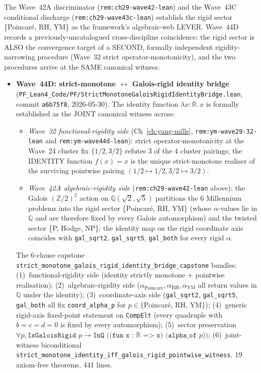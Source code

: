 \begin{remark}\label{rem:ch29-wave44d-lean}
The Wave~42A discriminator (\texttt{rem:ch29-wave42-lean}) and the Wave~43C conditional discharge (\texttt{rem:ch29-wave43c-lean}) establish the rigid sector \{Poincar\'e, RH, YM\} as the framework's algebraic-web LEVER. Wave~44D records a previously-uncatalogued cross-discipline coincidence: the rigid sector is ALSO the convergence target of a SECOND, formally independent rigidity-narrowing procedure (Wave~32 strict operator-monotonicity), and the two procedures arrive at the SAME canonical witness:
\begin{itemize}
  \item \textbf{Wave~44D: strict-monotone $\leftrightarrow$ Galois-rigid identity bridge} (\texttt{PF\_Lean4\_Code/PF/StrictMonotoneGaloisRigidIdentityBridge.lean}, commit \texttt{a6b75f8}, 2026-05-30). The identity function $\lambda x : \mathbb{R}.\, x$ is formally established as the JOINT canonical witness across:
  \begin{itemize}
    \item \emph{Wave~32 functional-rigidity side} (Ch~\ref{ch:yang-mills}, \texttt{rem:ym-wave29-32-lean} and \texttt{rem:ym-wave44d-lean}): strict operator-monotonicity at the Wave~24 cluster fix $\{1/2, 3/2\}$ refutes 3 of the 4 cluster pairings; the IDENTITY function $f(x) = x$ is the unique strict-monotone realiser of the surviving pointwise pairing $(1/2 \mapsto 1/2, 3/2 \mapsto 3/2)$.
    \item \emph{Wave~42A algebraic-rigidity side} (\texttt{rem:ch29-wave42-lean} above): the Galois $(\mathbb{Z}/2)^2$ action on $\mathbb{Q}(\sqrt{2}, \sqrt{5})$ partitions the 6 Millennium problems into the rigid sector \{Poincar\'e, RH, YM\} (whose $\alpha$-values lie in $\mathbb{Q}$ and are therefore fixed by every Galois automorphism) and the twisted sector \{P, Hodge, NP\}; the identity map on the rigid coordinate axis coincides with \texttt{gal\_sqrt2}, \texttt{gal\_sqrt5}, \texttt{gal\_both} for every rigid $\alpha$.
  \end{itemize}
  The 6-clause capstone \texttt{strict\_monotone\_galois\_rigid\_identity\_bridge\_capstone} bundles: (1)~functional-rigidity side (identity strictly monotone $+$ pointwise realisation); (2)~algebraic-rigidity side ($\alpha_{\mathrm{Poincar\acute{e}}}, \alpha_{\mathrm{RH}}, \alpha_{\mathrm{YM}}$ all return values in $\mathbb{Q}$ under the identity); (3)~coordinate-axis side (\texttt{gal\_sqrt2}, \texttt{gal\_sqrt5}, \texttt{gal\_both} all fix \texttt{coord\_alpha\_p} for $p \in \{$Poincar\'e, RH, YM$\}$); (4)~generic rigid-axis fixed-point statement on \texttt{CompElt} (every quadruple with $b = c = d = 0$ is fixed by every automorphism); (5)~sector preservation $\forall p, \texttt{IsGaloisRigid } p \to \texttt{InQ ((fun x : $\mathbb{R}$ => x) (alpha\_of } p))$; (6)~joint-witness biconditional \texttt{strict\_monotone\_identity\_iff\_galois\_rigid\_pointwise\_witness}. 19 axiom-free theorems, 441 lines.

\end{itemize}
\end{remark}
